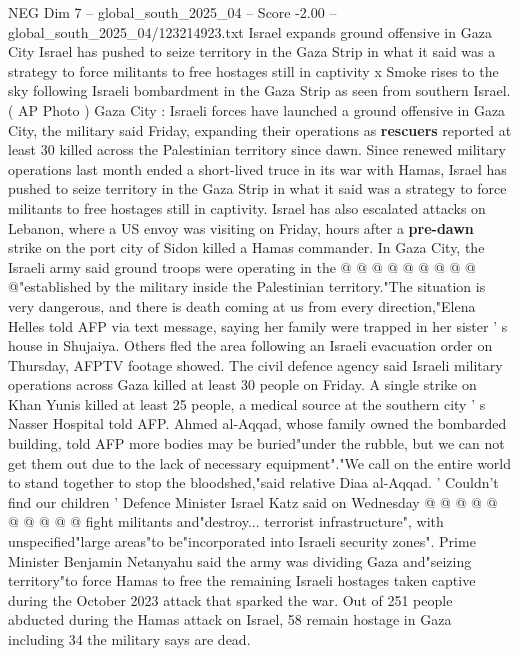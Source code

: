 \begin{textsample}{NEG Dim 7 – global\_south\_2025\_04 – Score -2.00 – global\_south\_2025\_04/123214923.txt}  \label{ex:f7_neg_049}
Israel expands ground offensive in Gaza City Israel has pushed to seize territory in the Gaza Strip in what it said was a strategy to force militants to free hostages still in captivity x Smoke rises to the sky following Israeli bombardment in the Gaza Strip as seen from southern Israel. ( AP Photo ) Gaza City : Israeli forces have launched a ground offensive in Gaza City, the military said Friday, expanding their operations as \textbf{rescuers} reported at least 30 killed across the Palestinian territory since dawn.
Since renewed military operations last month ended a short-lived truce in its war with Hamas, Israel has pushed to seize territory in the Gaza Strip in what it said was a strategy to force militants to free hostages still in captivity.
Israel has also escalated attacks on Lebanon, where a US envoy was visiting on Friday, hours after a \textbf{pre-dawn} strike on the port city of Sidon killed a Hamas commander.
In Gaza City, the Israeli army said ground troops were operating in the @ @ @ @ @ @ @ @ @ @"established by the military inside the Palestinian territory."The situation is very dangerous, and there is death coming at us from every direction,"Elena Helles told AFP via text message, saying her family were trapped in her sister ' s house in Shujaiya.
Others fled the area following an Israeli evacuation order on Thursday, AFPTV footage showed.
The civil defence agency said Israeli military operations across Gaza killed at least 30 people on Friday.
A single strike on Khan Yunis killed at least 25 people, a medical source at the southern city ' s Nasser Hospital told AFP.
Ahmed al-Aqqad, whose family owned the bombarded building, told AFP more bodies may be buried"under the rubble, but we can not get them out due to the lack of necessary equipment"."We call on the entire world to stand together to stop the bloodshed,"said relative Diaa al-Aqqad. ' Couldn't find our children ' Defence Minister Israel Katz said on Wednesday @ @ @ @ @ @ @ @ @ @ fight militants and"destroy... terrorist infrastructure", with unspecified"large areas"to be"incorporated into Israeli security zones".
Prime Minister Benjamin Netanyahu said the army was dividing Gaza and"seizing territory"to force Hamas to free the remaining Israeli hostages taken captive during the October 2023 attack that sparked the war.
Out of 251 people abducted during the Hamas attack on Israel, 58 remain hostage in Gaza including 34 the military says are dead.

\end{textsample}
